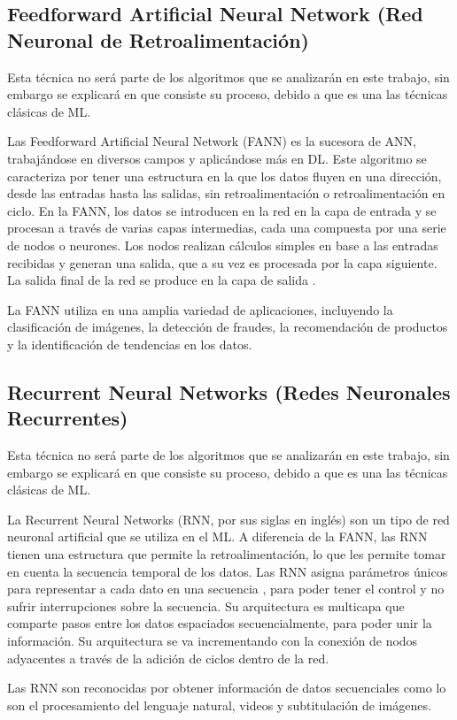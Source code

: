 \doublespacing
\subsection{Feedforward Artificial Neural Network (Red Neuronal de Retroalimentación)}
Esta técnica no será parte de los algoritmos que se analizarán en este trabajo, sin embargo se explicará en que consiste su proceso, debido a que es una las técnicas clásicas de ML. \\ \par Las Feedforward Artificial Neural Network (FANN) es la sucesora de ANN, trabajándose en diversos campos y aplicándose más en DL. Este algoritmo se caracteriza por tener una estructura en la que los datos fluyen en una dirección, desde las entradas hasta las salidas, sin retroalimentación o retroalimentación en ciclo. En la FANN, los datos se introducen en la red en la capa de entrada y se procesan a través de varias capas intermedias, cada una compuesta por una serie de nodos o neurones. Los nodos realizan cálculos simples en base a las entradas recibidas y generan una salida, que a su vez es procesada por la capa siguiente. La salida final de la red se produce en la capa de salida \cite{salas2004redes}.\\ 
\par La FANN utiliza en una amplia variedad de aplicaciones, incluyendo la clasificación de imágenes, la detección de fraudes, la recomendación de productos y la identificación de tendencias en los datos.\\

\doublespacing
\subsection{Recurrent Neural Networks (Redes Neuronales Recurrentes)}
Esta técnica no será parte de los algoritmos que se analizarán en este trabajo, sin embargo se explicará en que consiste su proceso, debido a que es una las técnicas clásicas de ML. \\
\par La Recurrent Neural Networks (RNN, por sus siglas en inglés) son un tipo de red neuronal artificial que se utiliza en el ML. A diferencia de la FANN, las RNN tienen una estructura que permite la retroalimentación, lo que les permite tomar en cuenta la secuencia temporal de los datos. Las RNN asigna parámetros únicos para representar a cada dato en una secuencia \cite{arana2021redes}, para poder tener el control y no sufrir interrupciones sobre la secuencia. Su arquitectura es multicapa que comparte pasos entre los datos espaciados secuencialmente, para poder unir la información. Su arquitectura se va incrementando con la conexión de nodos adyacentes a través de la adición de ciclos dentro de la red.\\
\par Las RNN son reconocidas por obtener información de datos secuenciales como lo son el procesamiento del lenguaje natural, videos y subtitulación de imágenes.\\


